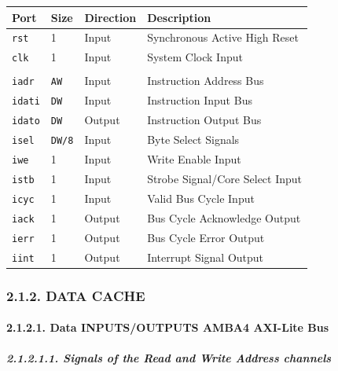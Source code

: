 \documentclass[]{article}
\let\oldparagraph\paragraph
\renewcommand{\paragraph}[1]{\oldparagraph{#1}\mbox{}}
\let\oldsubparagraph\subparagraph
\renewcommand{\subparagraph}[1]{\oldsubparagraph{#1}\mbox{}}
\begin{document}
\begin{longtable}[]{@{}llll@{}}
\toprule
Port & Size & Direction & Description\tabularnewline
\midrule
\endhead
\texttt{rst} & 1 & Input & Synchronous Active High Reset\tabularnewline
\texttt{clk} & 1 & Input & System Clock Input\tabularnewline
& & &\tabularnewline
\texttt{iadr} & \texttt{AW} & Input & Instruction Address
Bus\tabularnewline
\texttt{idati} & \texttt{DW} & Input & Instruction Input
Bus\tabularnewline
\texttt{idato} & \texttt{DW} & Output & Instruction Output
Bus\tabularnewline
\texttt{isel} & \texttt{DW/8} & Input & Byte Select
Signals\tabularnewline
\texttt{iwe} & 1 & Input & Write Enable Input\tabularnewline
\texttt{istb} & 1 & Input & Strobe Signal/Core Select
Input\tabularnewline
\texttt{icyc} & 1 & Input & Valid Bus Cycle Input\tabularnewline
\texttt{iack} & 1 & Output & Bus Cycle Acknowledge Output\tabularnewline
\texttt{ierr} & 1 & Output & Bus Cycle Error Output\tabularnewline
\texttt{iint} & 1 & Output & Interrupt Signal Output\tabularnewline
\bottomrule
\end{longtable}

\subsubsection{2.1.2. DATA CACHE}\label{data-cache}

\paragraph{2.1.2.1. Data INPUTS/OUTPUTS AMBA4 AXI-Lite
Bus}\label{data-inputsoutputs-amba4-axi-lite-bus}

\subparagraph{2.1.2.1.1. Signals of the Read and Write Address
channels}\label{signals-of-the-read-and-write-address-channels-1}
\end{document}
